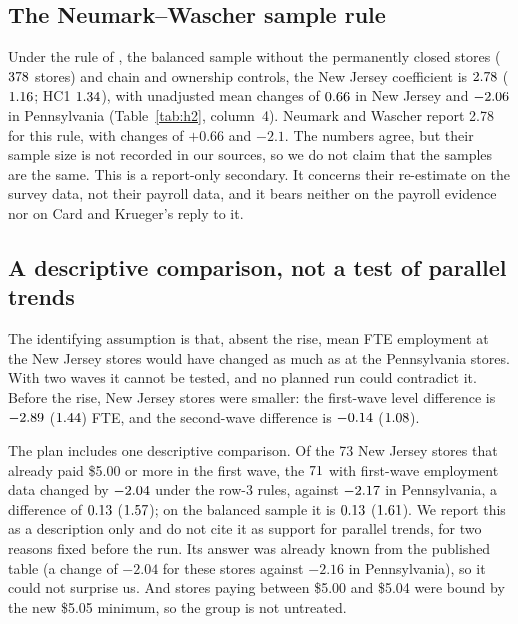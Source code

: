 \documentclass[11pt]{article}
\begin{document}
\subsection{The Neumark--Wascher sample rule}

Under the rule of \citet{neumark1995payroll}, the balanced sample without the permanently
closed stores ($378$ stores) and chain and ownership controls, the New Jersey
coefficient is $2.78$ ($1.16$; HC1 $1.34$), with unadjusted mean
changes of $0.66$ in New Jersey and $-2.06$ in Pennsylvania
(Table~\ref{tab:h2}, column~4). Neumark and Wascher report 2.78 for this rule, with changes of
$+0.66$ and $-2.1$. The numbers agree, but their sample size is not recorded in our sources,
so we do not claim that the samples are the same. This is a report-only secondary. It
concerns their re-estimate on the survey data, not their payroll data, and it bears neither
on the payroll evidence nor on Card and Krueger's reply to it.

\subsection{A descriptive comparison, not a test of parallel trends}

The identifying assumption is that, absent the rise, mean FTE employment at the New Jersey
stores would have changed as much as at the Pennsylvania stores. With two waves it cannot be
tested, and no planned run could contradict it. Before the rise, New Jersey stores were
smaller: the first-wave level difference is $-2.89$ ($1.44$) FTE, and the
second-wave difference is $-0.14$ ($1.08$).

The plan includes one descriptive comparison. Of the 73 New Jersey stores that already paid \$5.00 or more in the first wave, the
$71$ with first-wave employment data changed by $-2.04$ under the row-3
rules, against $-2.17$ in Pennsylvania, a difference of $0.13$
($1.57$); on the balanced sample it is $0.13$
($1.61$). We report this as a description only and do not cite it as
support for parallel trends, for two reasons fixed before the run. Its answer was already
known from the published table (a change of $-2.04$ for these stores against $-2.16$ in
Pennsylvania), so it could not surprise us. And stores paying between \$5.00 and \$5.04 were
bound by the new \$5.05 minimum, so the group is not untreated.
\end{document}
